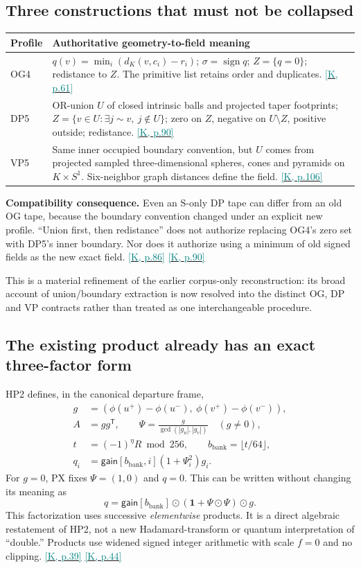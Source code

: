 \documentclass[11pt,a4paper]{article}
\newcommand{\kref}[1]{\hyperlink{baseline.#1}{\textcolor{teal}{[K, p.#1]}}}
\theoremstyle{lpstyle}
\newcommand{\sbit}[1]{(-1)^{#1}}
\begin{document}
\subsection{Three constructions that must not be collapsed}
\begin{tabularx}{\textwidth}{L{24mm}Y}
\toprule
\textbf{Profile}&\textbf{Authoritative geometry-to-field meaning}\\\midrule
OG4&$q(v)=\min_i(d_K(v,c_i)-r_i)$; $\sigma=\operatorname{sign}q$; $Z=\{q=0\}$; redistance to $Z$. The primitive list retains order and duplicates. \kref{61}\\
DP5&OR-union $U$ of closed intrinsic balls and projected taper footprints; $Z=\{v\in U:\exists j\sim v,\ j\notin U\}$; zero on $Z$, negative on $U\setminus Z$, positive outside; redistance. \kref{90}\\
VP5&Same inner occupied boundary convention, but $U$ comes from projected sampled three-dimensional spheres, cones and pyramids on $K\times S^1$. Six-neighbor graph distances define the field. \kref{106}\\\bottomrule
\end{tabularx}

\textbf{Compatibility consequence.} Even an S-only DP tape can differ from an old OG tape, because the boundary convention changed under an explicit new profile. ``Union first, then redistance'' does not authorize replacing OG4's zero set with DP5's inner boundary. Nor does it authorize using a minimum of old signed fields as the new exact field. \kref{86} \kref{90}

This is a material refinement of the earlier corpus-only reconstruction: its broad account of union/boundary extraction is now resolved into the distinct OG, DP and VP contracts rather than treated as one interchangeable procedure.

\subsection{The existing product already has an exact three-factor form}
HP2 defines, in the canonical departure frame,
\begin{align*}
g&=(\phi(u^+)-\phi(u^-),\ \phi(v^+)-\phi(v^-)),\\
A&=gg^{\mathsf T},\qquad
\Psi=\frac{g}{\gcd(|g_u|,|g_v|)}\quad(g\ne0),\\
t&=\sbit{\eta}R\bmod256,\qquad b_{\mathrm{bank}}=\lfloor t/64\rfloor,\\
q_i&=\mathsf{gain}[b_{\mathrm{bank}},i](1+\Psi_i^2)g_i.
\end{align*}
For $g=0$, PX fixes $\Psi=(1,0)$ and $q=0$. This can be written without changing its meaning as
\[
\boxed{q=\mathsf{gain}[b_{\mathrm{bank}}]\odot(\mathbf1+\Psi\odot\Psi)\odot g.}
\]
This factorization uses successive \emph{elementwise} products. It is a direct algebraic restatement of HP2, not a new Hadamard-transform or quantum interpretation of ``double.'' Products use widened signed integer arithmetic with scale $f=0$ and no clipping. \kref{39} \kref{44}
\end{document}

